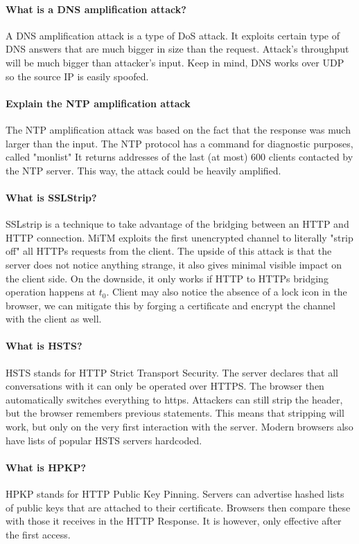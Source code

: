 \paragraph{What is a DNS amplification attack?}
A DNS amplification attack is a type of DoS attack. It exploits certain type of DNS answers that are much bigger in size than the request. Attack's throughput will be much bigger than attacker's input. Keep in mind, DNS works over UDP so the source IP is easily spoofed.

\paragraph{Explain the NTP amplification attack}
The NTP amplification attack was based on the fact that the response was much larger than the input. The NTP protocol has a command for diagnostic purposes, called "monlist" It returns addresses of the last (at most) 600 clients contacted by the NTP server. This way, the attack could be heavily amplified.

\paragraph{What is SSLStrip?}
SSLstrip is a technique to take advantage of the bridging between an HTTP and HTTP connection. MiTM exploits the first unencrypted channel to literally "strip off" all HTTPs requests from the client. The upside of this attack is that the server does not notice anything strange, it also gives minimal visible impact on the client side. On the downside, it only works if HTTP to HTTPs bridging operation happens at $t_0$. Client may also notice the absence of a lock icon in the browser, we can mitigate this by forging a certificate and encrypt the channel with the client as well.

\paragraph{What is HSTS?}
HSTS stands for HTTP Strict Transport Security. The server declares that all conversations with it can only be operated over HTTPS. The browser then automatically switches everything to https. Attackers can still strip the header, but the browser remembers previous statements. This means that stripping will work, but only on the very first interaction with the server. Modern browsers also have lists of popular HSTS servers hardcoded.

\paragraph{What is HPKP?}
HPKP stands for HTTP Public Key Pinning. Servers can advertise hashed lists of public keys that are attached to their certificate. Browsers then compare these with those it receives in the HTTP Response. It is however, only effective after the first access.